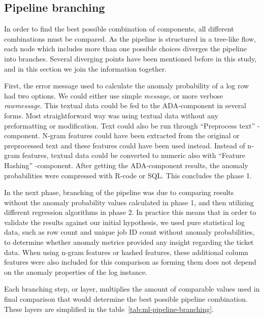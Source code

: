 

\subsection{Pipeline branching}\label{subsec:pipe-branching}

In order to find the best possible combination of components,
all different combinations must be compared.
As the pipeline is structured in a tree-like flow,
each node which includes more than one possible choices
diverges the pipeline into branches.
Several diverging points have been mentioned before in this study,
and in this section we join the information together.

First,
the error message used to calculate the anomaly probability of a log row
had two options.
We could either use simple \textit{message},
or more verbose \textit{rawmessage}.
This textual data could be fed to the ADA-component in several forms.
Most straightforward way was using textual data without any preformatting or modification.
Text could also be run through \enquote{Preprocess text} -component.
N-gram features could have been extracted from the original or preprocessed text
and these features could have been used instead.
Instead of n-gram features,
textual data could be converted to numeric
also with \enquote{Feature Hashing} -component.
After getting the ADA-component results,
the anomaly probabilities were compressed with R-code or SQL.\@
This concludes the phase 1.

In the next phase,
branching of the pipeline was due to
comparing results without the anomaly probability values calculated in phase 1,
and then utilizing different regression algorithms in phase 2.
In practice this means
that in order to validate the results against our initial hypothesis,
we used pure statistical log data,
such as row count and unique job ID count
without anomaly probabilities,
to determine whether anomaly metrics provided any insight regarding the ticket data.
When using n-gram features or hashed features,
these additional column features were also included for this comparison
as forming them does not depend on the anomaly properties of the log instance.

Each branching step, or layer,
multiplies the amount of comparable values used in final comparison
that would determine the best possible pipeline combination.
These layers are simplified in the table~\ref{tab:ml-pipeline-branching}.

